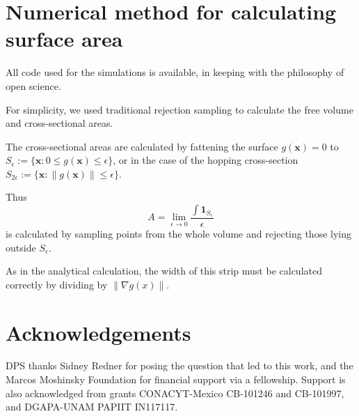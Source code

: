 \documentclass[superscriptaddress,pre,reprint,showpacs,twocolumn]{revtex4-1}
\begin{document}
\section{Numerical method for calculating surface area}
    
All code used for the simulations is available, in keeping with the philosophy of open science.

For simplicity, we used traditional rejection sampling to calculate the free volume and cross-sectional areas.

The cross-sectional areas are calculated by fattening the surface $g(\mathbf{x}) = 0$ to $S_\epsilon := \{ \mathbf{x} : 0 \le g(\mathbf{x}) \le \epsilon \}$, or in the
case of the hopping cross-section $S_{2 \epsilon} := \{ \mathbf{x}: \|g(\mathbf{x}) \| \le \epsilon \}$.

Thus 
$$A = \lim_{\epsilon \to 0} \frac{ \int \mathbf{1}_{S_\epsilon}}{\epsilon}$$ 
is calculated by sampling points from the whole volume and rejecting those lying outside $S_\epsilon$.
 
As in the analytical calculation, the width of this strip must be calculated correctly by dividing by $\| \nabla g(x) \|$.

    
\section*{Acknowledgements}


DPS thanks Sidney Redner for posing the question that led to this work, and the Marcos Moshinsky Foundation for financial support via a fellowship.
Support is also acknowledged from grants CONACYT-Mexico CB-101246 and CB-101997, and DGAPA-UNAM PAPIIT IN117117.





\end{document}
